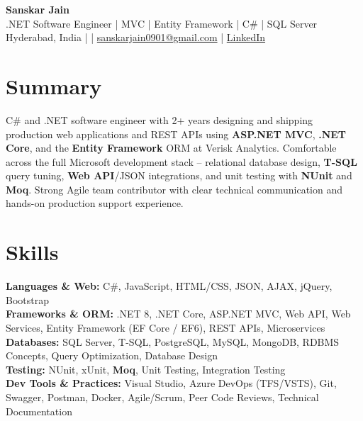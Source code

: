 \documentclass[10pt,letterpaper]{article}
\begin{document}
\begin{center}
    {\Large \textbf{Sanskar Jain}} \\
    .NET Software Engineer \;|\; MVC \;|\; Entity Framework \;|\; C\# \;|\; SQL Server \\
    Hyderabad, India \enspace |  \enspace | \enspace
    \href{mailto:sanskarjain0901@gmail.com}{sanskarjain0901@gmail.com} \enspace | \enspace
    \href{https://www.linkedin.com/in/sanskar-jain0901/}{LinkedIn}
\end{center}

\vspace{2pt}

\section*{Summary}
C\# and .NET software engineer with 2+ years designing and shipping production web applications and REST APIs using \textbf{ASP.NET MVC}, \textbf{.NET Core}, and the \textbf{Entity Framework} ORM at Verisk Analytics. Comfortable across the full Microsoft development stack -- relational database design, \textbf{T-SQL} query tuning, \textbf{Web API}/JSON integrations, and unit testing with \textbf{NUnit} and \textbf{Moq}. Strong Agile team contributor with clear technical communication and hands-on production support experience.

\section*{Skills}
\textbf{Languages \& Web:} C\#, JavaScript, HTML/CSS, JSON, AJAX, jQuery, Bootstrap \\
\textbf{Frameworks \& ORM:} .NET 8, .NET Core, ASP.NET MVC, Web API, Web Services, Entity Framework (EF Core / EF6), REST APIs, Microservices \\
\textbf{Databases:} SQL Server, T-SQL, PostgreSQL, MySQL, MongoDB, RDBMS Concepts, Query Optimization, Database Design \\
\textbf{Testing:} NUnit, xUnit, \textbf{Moq}, Unit Testing, Integration Testing \\
\textbf{Dev Tools \& Practices:} Visual Studio, Azure DevOps (TFS/VSTS), Git, Swagger, Postman, Docker, Agile/Scrum, Peer Code Reviews, Technical Documentation
\end{document}
